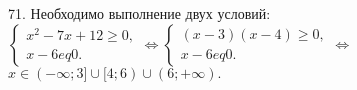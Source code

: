 71. Необходимо выполнение двух условий: $\begin{cases} x^2-7x+12\geqslant0,\\ x-6
eq0.\end{cases}\Leftrightarrow
\begin{cases} (x-3)(x-4)\geqslant0,\\ x-6
eq0.\end{cases}
\Leftrightarrow$\\$ x\in (-\infty;3]\cup[4;6)\cup(6;+\infty).$\\
